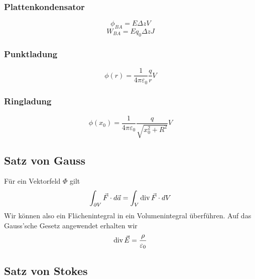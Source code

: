 \subsubsection{Plattenkondensator}
\[\phi_{BA} = E \Delta z \unit{V}\]
\[W_{BA} = E q_0 \Delta z \unit{J}\]
\subsubsection{Punktladung}
\[\phi(r) = \frac{1}{4\pi \varepsilon_0}\frac{q}{r}\unit{V}\]

\subsubsection{Ringladung}
\[\phi(x_0) = \frac{1}{4\pi \varepsilon_0}\frac{q}{\sqrt{x_0^2+R^2}}\unit{V}\]

\subsection{Satz von Gauss}
Für ein Vektorfeld $\Phi$ gilt
\[\int_{\partial V} \vec{F} \cdot d \vec{a} = \int_{V}\operatorname{div} \vec{F} \cdot dV\]
Wir können also ein Flächenintegral in ein Volumenintegral überführen.
Auf das Gauss'sche Gesetz angewendet erhalten wir
\[\operatorname{div} \vec{E} = \frac{\rho}{\varepsilon_0}\]

\subsection{Satz von Stokes}
